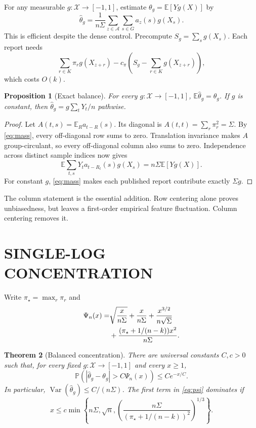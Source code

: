 \documentclass[twoside]{article}
\newtheorem{theorem}{Theorem}
\newtheorem{proposition}[theorem]{Proposition}
\newcommand{\E}{\mathbb E}
\newcommand{\Pp}{\mathbb P}
\newcommand{\1}{\mathbf 1}
\newcommand{\cA}{\mathcal A}
\newcommand{\Var}{\operatorname{Var}}
\begin{document}
For any measurable $g:\mathcal X\to[-1,1]$, estimate $\theta_g=\E[Yg(X)]$ by
\begin{equation}
 \widehat\theta_g=\frac1{n\Sigma}
 \sum_{z\in\cA}\sum_{s\in G}a_z(s)g(X_s).
 \label{eq:estimator}
\end{equation}
This is efficient despite the dense control. Precompute $S_g=\sum_sg(X_s)$. Each report needs
\begin{equation}
 \sum_{r\in K}\pi_r g(X_{z+r})
 -c_\pi\left(S_g-\sum_{r\in K}g(X_{z+r})\right),
 \label{eq:fastscore}
\end{equation}
which costs $O(k)$.

\begin{proposition}[Exact balance]\label{prop:unbiased}
For every $g:\mathcal X\to[-1,1]$, $\E\widehat\theta_g=\theta_g$. If $g$ is constant, then $\widehat\theta_g=g\sum_tY_t/n$ pathwise.
\end{proposition}

\begin{proof}
Let $A(t,s)=\E_R a_{t-R}(s)$. Its diagonal is $A(t,t)=\sum_r\pi_r^2=\Sigma$. By \eqref{eq:mass}, every off-diagonal row sums to zero. Translation invariance makes $A$ group-circulant, so every off-diagonal column also sums to zero. Independence across distinct sample indices now gives \[ \E\sum_{t,s}Y_t a_{t-R_t}(s)g(X_s) =n\Sigma\E[Yg(X)]. \] For constant $g$, \eqref{eq:mass} makes each published report contribute exactly $\Sigma g$.
\end{proof}

The column statement is the essential addition. Row centering alone proves unbiasedness, but leaves a first-order empirical feature fluctuation. Column centering removes it.

\section{SINGLE-LOG CONCENTRATION}

Write $\pi_\star=\max_r\pi_r$ and
\begin{align}
 \Psi_n(x)=&\sqrt{\frac{x}{n\Sigma}}+\frac{x}{n\Sigma}
 +\frac{x^{3/2}}{n\sqrt\Sigma}\notag\\
 &+\frac{(\pi_\star+1/(n-k))x^2}{n\Sigma}.
 \label{eq:psi}
\end{align}

\begin{theorem}[Balanced concentration]\label{thm:concentration}
There are universal constants $C,c>0$ such that, for every fixed $g:\mathcal X\to[-1,1]$ and every $x\ge1$,
\begin{equation}
 \Pp\left(|\widehat\theta_g-\theta_g|>C\Psi_n(x)\right)
 \le C e^{-x/C}.
 \label{eq:tail}
\end{equation}
In particular, $\Var(\widehat\theta_g)\le C/(n\Sigma)$. The first term in \eqref{eq:psi} dominates if
\begin{equation}
 x\le c\min\left\{n\Sigma,\sqrt n,
 \left(\frac{n\Sigma}{(\pi_\star+1/(n-k))^2}\right)^{1/3}\right\}.
 \label{eq:range}
\end{equation}
\end{theorem}
\end{document}
